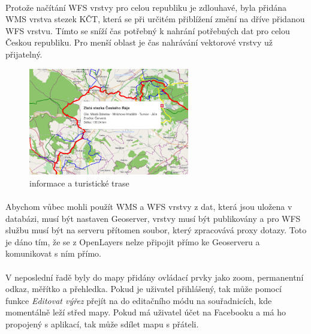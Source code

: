 \documentclass[11pt,a4paper,titlepage,oneside]{book}
\begin{document}

			\paragraph{} Protože načítání WFS vrstvy pro celou republiku je zdlouhavé, byla přidána WMS vrstva stezek KČT, která se při určitém přiblížení změní na dříve přidanou WFS vrstvu. Tímto se sníží čas potřebný k nahrání potřebných dat pro celou Českou republiku. Pro menší oblast je čas nahrávání vektorové vrstvy už přijatelný.
		\begin{figure}[!h]
			\begin{center}
				\includegraphics[width=7cm]{obrazky/toulavej/infoTrack.png}
				\caption{informace a turistické trase}
				\label{fig:infoTrack}
			\end{center}
		\end{figure}	

			\paragraph{} Abychom vůbec mohli použít WMS a WFS vrstvy z dat, která jsou uložena v databázi, musí být nastaven Geoserver, vrstvy musí být publikovány a pro WFS službu musí být na serveru přítomen soubor, který zpracovává proxy dotazy. Toto je dáno tím, že se z OpenLayers nelze připojit přímo ke Geoserveru a komunikovat s ním přímo. 
			\paragraph{} V neposlední řadě byly do mapy přidány ovládací prvky jako zoom, permanentní odkaz, měřítko a přehledka. Pokud je uživatel přihlášený, tak může pomocí funkce \textit{Editovat výřez} přejít na do editačního módu na souřadnicích, kde momentálně leží střed mapy. Pokud má uživatel účet na Facebooku a má ho propojený s aplikací, tak může sdílet mapu s přáteli.
\end{document}
